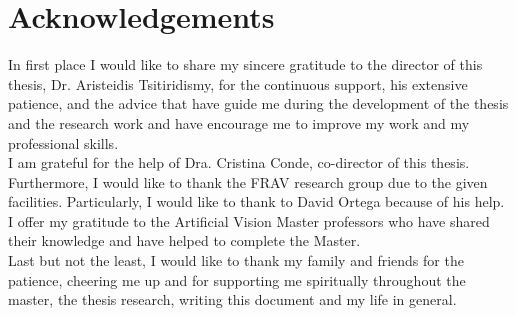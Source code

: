 \chapter*{Acknowledgements} %
In first place I would like to share my sincere gratitude to the director of this thesis, Dr. Aristeidis Tsitiridismy, for the continuous support, his extensive patience, and the advice that have guide me during the development of the thesis and the research work and have encourage me to improve my work and my professional skills.\\

I am grateful for the help of Dra. Cristina Conde, co-director of this thesis. Furthermore, I would like to thank the FRAV research group due to the given facilities. Particularly, I would like to thank to David Ortega because of his help.\\

I offer my gratitude to the Artificial Vision Master professors who have shared their knowledge and have helped to complete the Master.\\

Last but not the least, I would like to thank my family and friends for the patience, cheering me up and for supporting me spiritually throughout the master, the thesis research, writing this document and my life in general.\\
